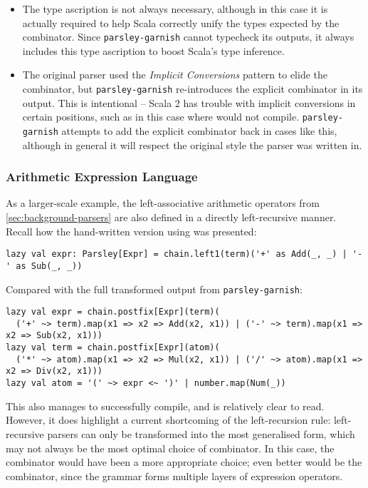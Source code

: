 \documentclass[../../main.tex]{subfiles}
\begin{document}
\begin{itemize}
  \item The type ascription  is not always necessary, although in this case it is actually required to help Scala correctly unify the types expected by the combinator. Since \texttt{parsley-garnish} cannot typecheck its outputs, it always includes this type ascription to boost Scala's type inference.
  \item The original parser used the \emph{Implicit Conversions} pattern to elide the  combinator, but \texttt{parsley-garnish} re-introduces the explicit  combinator in its output. This is intentional -- Scala 2 has trouble with implicit conversions in certain positions, such as in this case where  would not compile. \texttt{parsley-garnish} attempts to add the explicit combinator back in cases like this, although in general it will respect the original style the parser was written in.
\end{itemize}

\subsubsection{Arithmetic Expression Language}
As a larger-scale example, the left-associative arithmetic operators from \cref{sec:background-parsers} are also defined in a directly left-recursive manner.
Recall how the hand-written version using  was presented:
\begin{verbatim}
lazy val expr: Parsley[Expr] = chain.left1(term)('+' as Add(_, _) | '-' as Sub(_, _))
\end{verbatim}
%
Compared with the full transformed output from \texttt{parsley-garnish}:
\begin{verbatim}
lazy val expr = chain.postfix[Expr](term)(
  ('+' ~> term).map(x1 => x2 => Add(x2, x1)) | ('-' ~> term).map(x1 => x2 => Sub(x2, x1)))
lazy val term = chain.postfix[Expr](atom)(
  ('*' ~> atom).map(x1 => x2 => Mul(x2, x1)) | ('/' ~> atom).map(x1 => x2 => Div(x2, x1)))
lazy val atom = '(' ~> expr <~ ')' | number.map(Num(_))
\end{verbatim}
%
This also manages to successfully compile, and is relatively clear to read.
However, it does highlight a current shortcoming of the left-recursion rule: left-recursive parsers can only be transformed into the most generalised  form, which may not always be the most optimal choice of combinator.
In this case, the  combinator would have been a more appropriate choice; even better would be the  combinator, since the grammar forms multiple layers of expression operators.
\end{document}
